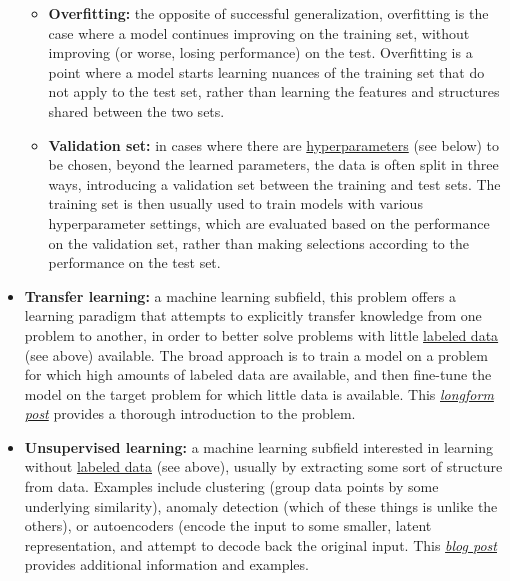 \begin{itemize}
\begin{itemize}
  \item \textbf{Overfitting:\label{tg:overfitting}} the opposite of successful generalization, overfitting is the case where a model continues improving on the training set, without improving (or worse, losing performance) on the test. Overfitting is a point where a model starts learning nuances of the training set that do not apply to the test set, rather than learning the features and structures shared between the two sets.
  
  \item \textbf{Validation set:\label{tg:validation}} in cases where there are \hyperref[tg:hyperparameters]{hyperparameters} (see below) to be chosen, beyond the learned parameters, the data is often split in three ways, introducing a validation set between the training and test sets. The training set is then usually used to train models with various hyperparameter settings, which are evaluated based on the performance on the validation set, rather than making selections according to the performance on the test set.
  \end{itemize}
  
\item \textbf{Transfer learning:\label{tg:transfer}} a machine learning subfield, this problem offers a learning paradigm that attempts to explicitly transfer knowledge from one problem to another, in order to better solve problems with little \hyperref[tg:labeled-data]{labeled data} (see above) available. The broad approach is to train a model on a problem for which high amounts of labeled data are available, and then fine-tune the model on the target problem for which little data is available. This \href{http://ruder.io/transfer-learning/}{\emph{longform post}} provides a thorough introduction to the problem.

\item \textbf{Unsupervised learning:\label{tg:unsupervised}} a machine learning subfield interested in learning without \hyperref[tg:labeled-data]{labeled data} (see above), usually by extracting some sort of structure from data. Examples include clustering (group data points by some underlying similarity), anomaly detection (which of these things is unlike the others), or autoencoders (encode the input to some smaller, latent representation, and attempt to decode back the original input. This \href{https://blog.algorithmia.com/introduction-to-unsupervised-learning/}{\emph{blog post}} provides additional information and examples.


\end{itemize}
